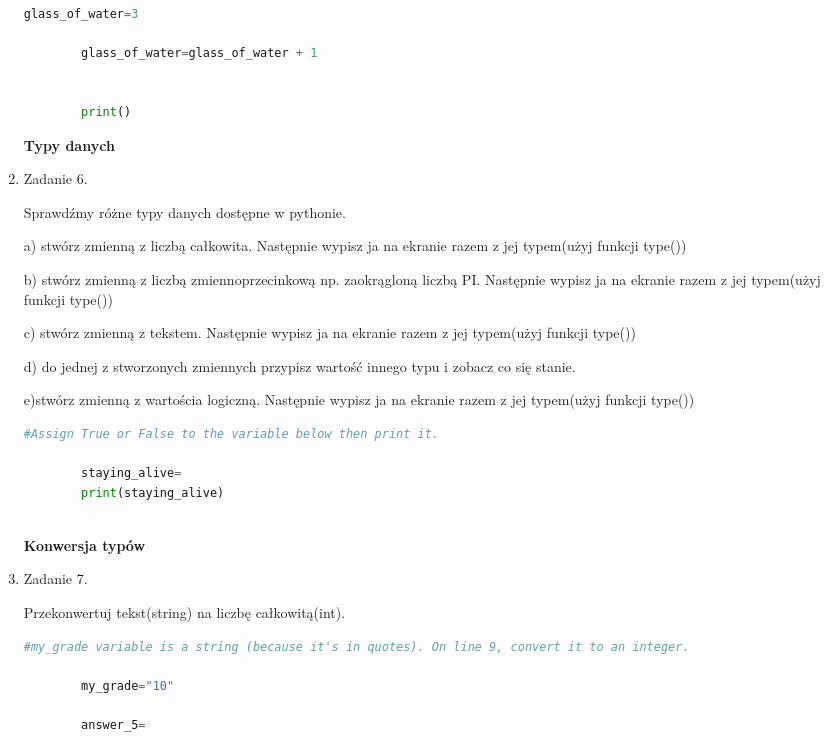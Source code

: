 \documentclass[11pt]{article}
\begin{document}
\begin{enumerate}
\begin{lstlisting}[language=Python]
		glass_of_water=3
		
		glass_of_water=glass_of_water + 1
		
		
		print()
	\end{lstlisting}
	\medskip
	\begin{Large}
		\textbf{Typy danych}
	\end{Large}
	\par
	
	\item 
	\begin{Large}
		Zadanie 6.
	\end{Large}
	\par
	Sprawdźmy różne typy danych dostępne w pythonie.
	\par
	\bigskip
	a) stwórz zmienną z liczbą całkowita. Następnie wypisz ja na ekranie razem z jej typem(użyj funkcji type())
	\par
	\bigskip
	b) stwórz zmienną z liczbą zmiennoprzecinkową np. zaokrągloną liczbą PI. Następnie wypisz ja na ekranie razem z jej typem(użyj funkcji type())
	\par
	\bigskip
	c) stwórz zmienną z tekstem. Następnie wypisz ja na ekranie razem z jej typem(użyj funkcji type())
	\par
	\bigskip
	d) do jednej z stworzonych zmiennych przypisz wartość innego typu i zobacz co się stanie.
	\par
	\bigskip
	e)stwórz zmienną z wartościa logiczną. Następnie wypisz ja na ekranie razem z jej typem(użyj funkcji type())
	\begin{lstlisting}[language=Python]
		#Assign True or False to the variable below then print it.
		
		staying_alive=
		print(staying_alive)
		
	\end{lstlisting}

	\medskip
	\begin{Large}
		\textbf{Konwersja typów}
	\end{Large}
	\item
	\begin{Large}
		Zadanie 7.
	\end{Large} 
	\par
	Przekonwertuj tekst(string) na liczbę całkowitą(int).
	\begin{lstlisting}[language=Python]
		#my_grade variable is a string (because it's in quotes). On line 9, convert it to an integer.
		
		my_grade="10"
		
		answer_5=
		

\end{lstlisting}
\end{enumerate}
\end{document}

